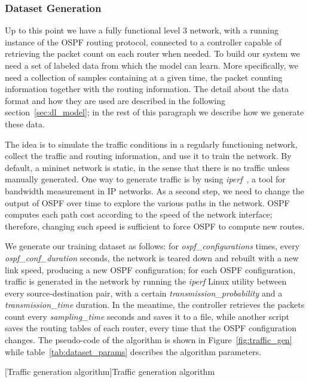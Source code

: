 \subsubsection{Dataset Generation}
Up to this point we have a fully functional level 3 network, with a running instance of the OSPF routing protocol, connected to a controller capable of retrieving the packet count on each router when needed. To build our system we need a set of labeled data from which the model can learn. More specifically, we need a collection of samples containing at a given time, the packet counting information together with the routing information. The detail about the data format and how they are used are described in the following section~\ref{sec:dl_model}; in the rest of this paragraph we describe how we generate these data.

The idea is to simulate the traffic conditions in a regularly functioning network, collect the traffic and routing information, and use it to train the network. By default, a mininet network is static, in the sense that there is no traffic unless manually generated. One way to generate traffic is by using \textit{iperf}~\cite{iperf}, a tool for bandwidth measurement in IP networks. As a second step, we need to change the output of OSPF over time to explore the various paths in the network. OSPF computes each path cost according to the speed of the network interface; therefore,  changing such speed is sufficient to force OSPF to compute new routes. 

We generate our training dataset as follows: for \textit{ospf\_configurations} times, every \textit{ospf\_conf\_duration} seconds, the network is teared down and rebuilt with a new link speed, producing a new OSPF configuration; for each OSPF configuration, traffic is generated in the network by running the \textit{iperf} Linux utility between every source-destination pair, with a certain \textit{transmission\_probability} and a \textit{transmission\_time} duration. In the meantime, the controller retrieves the packets count every \textit{sampling\_time} seconds and saves it to a file, while another script saves the routing tables of each router, every time that the OSPF configuration changes. The pseudo-code of the algorithm is shown in Figure~\ref{fig:traffic_gen} while table~\ref{tab:dataset_params} describes the algorithm parameters.

\begin{algorithm}[t]
[Traffic generation algorithm]{Traffic generation algorithm}
\label{fig:traffic_gen}
\begin{algorithmic}
		\ENDIF
	\ENDFOR
\ENDFOR
\end{algorithmic}
\end{algorithm}

